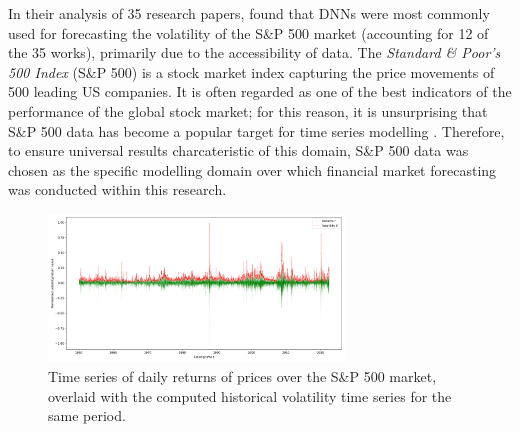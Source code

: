 \documentclass[a4paper, 11pt]{report}
\begin{document}
    In their analysis of 35 research papers, \citet{ge-2022} found that DNNs were most commonly used for forecasting the volatility of the S\&P 500 market (accounting for 12 of the 35 works), primarily due to the accessibility of data. The \emph{Standard \& Poor's 500 Index} (S\&P 500) is a stock market index capturing the price movements of 500 leading US companies. It is often regarded as one of the best indicators of the performance of the global stock market; for this reason, it is unsurprising that S\&P 500 data has become a popular target for time series modelling \citep{thakkar-2021}. Therefore, to ensure universal results charcateristic of this domain, S\&P 500 data was chosen as the specific modelling domain over which financial market forecasting was conducted within this research.

    \begin{figure}[ht]
        \centering
        \includegraphics[width=0.7\textwidth]{volatility.png}
        \caption{\centering Time series of daily returns of prices over the S\&P 500 market, overlaid with the computed historical volatility time series for the same period.}
        \label{fig: ret-vol}
    \end{figure}
\end{document}
